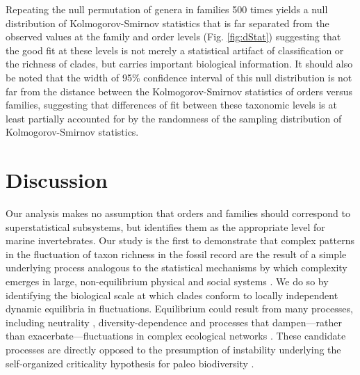 \documentclass[12pt]{article}
\let\citep=\cite
\begin{document}
Repeating the null permutation of genera in families 500 times yields
a null distribution of Kolmogorov-Smirnov statistics that is far
separated from the observed values at the family and order levels
(Fig. \ref{fig:dStat}) suggesting that the good fit at these levels is not
merely a statistical artifact of classification or the richness of
clades, but carries important biological information. It should also
be noted that the width of 95\% confidence interval of this null
distribution is not far from the distance between the
Kolmogorov-Smirnov statistics of orders versus families, suggesting
that differences of fit between these taxonomic levels is at least
partially accounted for by the randomness of the sampling distribution
of Kolmogorov-Smirnov statistics.

\section{Discussion}

Our analysis makes no assumption that orders and families should
correspond to superstatistical subsystems, but identifies them as the
appropriate level for marine invertebrates. Our study is the first to
demonstrate that complex patterns in the fluctuation of taxon richness
in the fossil record are the result of a simple underlying process
analogous to the statistical mechanisms by which complexity emerges in
large, non-equilibrium physical \citep{beck2004} and social systems
\citep{fuentes2009}.  We do so by identifying the biological scale at
which clades conform to locally independent dynamic equilibria in
fluctuations.  Equilibrium could result from many processes, including
neutrality \citep{macWilson, hubbell2001, olszewski2004},
diversity-dependence \citep{rabosky2009ecolLett, moen2014, foote2018}
and processes that dampen---rather than exacerbate---fluctuations in
complex ecological networks \citep{berlow2009}. These candidate
processes are directly opposed to the presumption of instability
underlying the self-organized criticality hypothesis for paleo
biodiversity \citep{bak1993, sole1997}.
\end{document}
